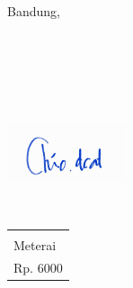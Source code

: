 \documentclass[11pt,a4paper,twoside,openright,notitlepage]{report}
\begin{document}
{{{	\begin{flushright}	
		Bandung,\ \vbulan\ \vtahun \\
		    {\begin{Form} \ \digsigfield{5cm}{2.25cm}{\vnama}\ \end{Form}\\}
		    {
		        {\includegraphics[width=3.5cm,height=3.5cm,keepaspectratio]{ttd}\\}
		        {{
		            {\vspace{0.5cm}
        		    \begin{tabular}{|p{1.75cm}|}\hline\\Meterai\\Rp. 6000\\ \hline\end{tabular}\\\vspace{0.5cm}}
        		    {\vspace{2.5cm}}
		        }
		        }    
        	}
		\vnama \\
		\vnpm
	\end{flushright}
	 \cleardoublepage 

}{}%

}}
\end{document}
